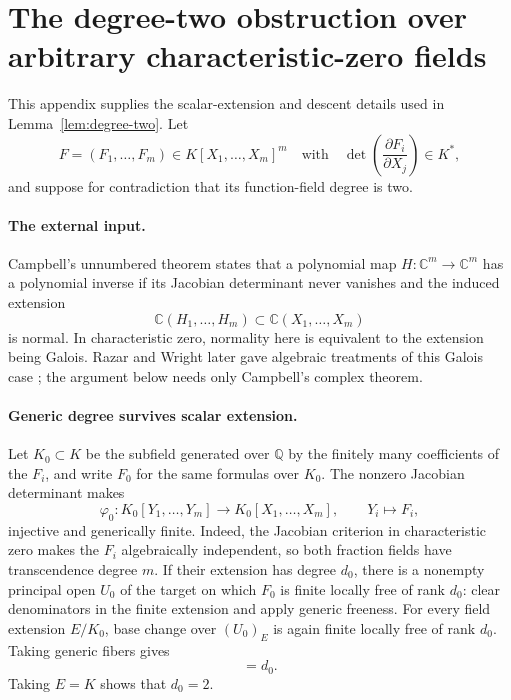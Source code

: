 \section{The degree-two obstruction over arbitrary characteristic-zero fields}
\label{app:degree-two}

This appendix supplies the scalar-extension and descent details used in
Lemma~\ref{lem:degree-two}.  Let
\[
 F=(F_1,\ldots,F_m)\in K[X_1,\ldots,X_m]^m
 \quad\text{with}\quad
 \det\left(\frac{\partial F_i}{\partial X_j}\right)\in K^*,
\]
and suppose for contradiction that its function-field degree is two.

\paragraph{The external input.}
Campbell's unnumbered theorem
\cite[Theorem, p.~244]{Campbell} states that a polynomial map
\(H:\mathbb C^m\to\mathbb C^m\) has a polynomial inverse if its Jacobian
determinant never vanishes and the induced extension
\[
 \mathbb C(H_1,\ldots,H_m)\subset
 \mathbb C(X_1,\ldots,X_m)
\]
is normal.  In characteristic zero, normality here is equivalent to the
extension being Galois.  Razar and Wright later gave algebraic treatments of
this Galois case \cite{Razar,Wright}; the argument below needs only
Campbell's complex theorem.

\paragraph{Generic degree survives scalar extension.}
Let \(K_0\subset K\) be the subfield generated over \(\mathbb Q\) by the
finitely many coefficients of the \(F_i\), and write \(F_0\) for the same
formulas over \(K_0\).  The nonzero Jacobian determinant makes
\begin{equation}
 \varphi_0:K_0[Y_1,\ldots,Y_m]\longrightarrow
 K_0[X_1,\ldots,X_m],
 \qquad Y_i\longmapsto F_i,
 \label{eq:degree-two-coordinate-map}
\end{equation}
injective and generically finite.  Indeed, the Jacobian criterion in
characteristic zero makes the \(F_i\) algebraically independent, so both
fraction fields have transcendence degree \(m\).  If their extension has
degree \(d_0\), there is a nonempty principal open \(U_0\) of the target on
which \(F_0\) is finite locally free of rank \(d_0\): clear denominators in
the finite extension and apply generic freeness.  For every field extension
\(E/K_0\), base change over \((U_0)_E\) is again finite locally free of rank
\(d_0\).  Taking generic fibers gives
\begin{equation}
 [E(X_1,\ldots,X_m):E(F_1,\ldots,F_m)]=d_0.
 \label{eq:degree-two-base-change}
\end{equation}
Taking \(E=K\) shows that \(d_0=2\).

